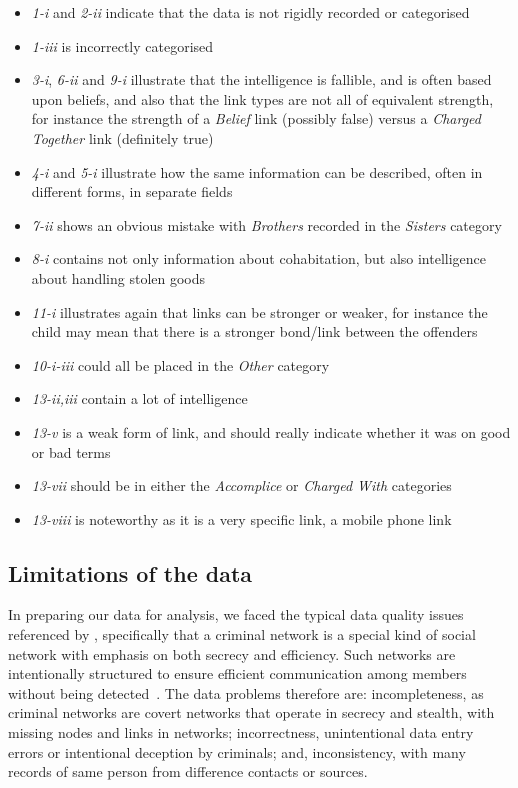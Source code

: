 \documentclass[twocolumn]{svjour3}          %
\theoremstyle{definition}
\begin{document}
\begin{itemize}
\item	\emph{1-i} and \emph{2-ii} indicate that the data is not rigidly recorded or categorised 
\item	\emph{1-iii} is incorrectly categorised
\item	\emph{3-i}, \emph{6-ii} and \emph{9-i} illustrate that the
  intelligence is fallible, and is often based upon beliefs, and also
  that the link types are not all of equivalent strength, for instance
  the strength of a \emph{Belief} link (possibly false) versus a \emph{Charged
  Together} link (definitely true)
\item	\emph{4-i} and \emph{5-i} illustrate how the same information can be described, often in different forms, in separate fields
\item	\emph{7-ii} shows an obvious mistake with \emph{Brothers} recorded in the \emph{Sisters} category
\item	\emph{8-i} contains not only information about cohabitation, but also intelligence about handling stolen goods
\item	\emph{11-i} illustrates again that links can be stronger or weaker, for instance the child may mean that there is a stronger bond/link between the offenders
\item	\emph{10-i-iii} could all be placed in the \emph{Other} category
\item	\emph{13-ii,iii} contain a lot of intelligence
\item	\emph{13-v} is a weak form of link, and should really indicate whether it was on good or bad terms
\item	\emph{13-vii} should be in either the \emph{Accomplice} or
  \emph{Charged With} categories
\item	\emph{13-viii} is noteworthy as it is a very specific link, a mobile phone link
\end{itemize}


\subsection{Limitations of the data}\label{sec:limitations}

In preparing our data for analysis, we faced the typical data quality
issues referenced by \citet{xu+chen:2005}, specifically that a criminal
network is a special kind of social network with emphasis on both
secrecy and efficiency. Such networks are intentionally structured to
ensure efficient communication among members without being
detected~\citep{ferrara-et-al:2014}. The data problems therefore are:
incompleteness, as criminal networks are covert networks that operate
in secrecy and stealth, with missing nodes and links in networks;
incorrectness, unintentional data entry errors or intentional
deception by criminals; and, inconsistency, with many records of same
person from difference contacts or sources.
\end{document}
